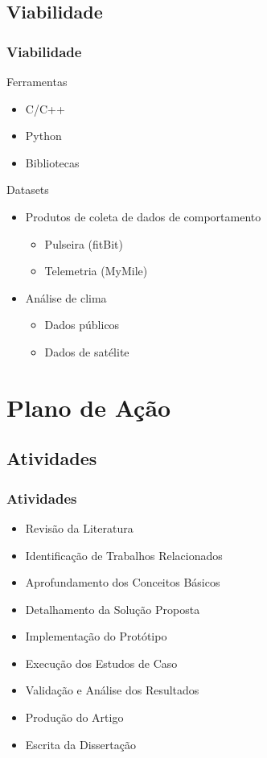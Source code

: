 \documentclass[hyperref={pdfpagelabels=false}]{beamer}
\begin{document}
\subsection{Viabilidade}  

\begin{frame}
	\frametitle{Viabilidade}
    
    \Large{Ferramentas}
    \normalsize
    \begin{itemize}
   		\item C/C++
		\item Python
        \item Bibliotecas 
    \end{itemize}
    \Large{Datasets}
    \normalsize
    \begin{itemize}
     	\item Produtos de coleta de dados de comportamento \begin{itemize}
        	\item Pulseira (fitBit)
        	\item Telemetria (MyMile)
        \end{itemize}
        \item Análise de clima \begin{itemize}
        	\item Dados públicos
            \item Dados de satélite
        \end{itemize}
    \end{itemize}
   
\end{frame}

\section{Plano de Ação}

\subsection{Atividades}
\begin{frame}
	\frametitle{Atividades}
    
    \begin{itemize}
	    \item Revisão da Literatura
        \item Identificação de Trabalhos Relacionados
        \item Aprofundamento dos Conceitos Básicos
        \item Detalhamento da Solução Proposta
        \item Implementação do Protótipo
        \item Execução dos Estudos de Caso
        \item Validação e Análise dos Resultados
        \item Produção do Artigo
        \item Escrita da Dissertação
    \end{itemize}
\end{frame}
\end{document}
